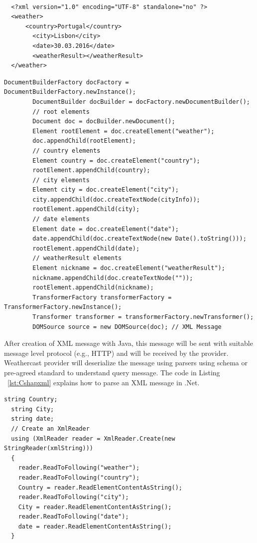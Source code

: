 \begin{lstlisting}[caption=Example XML message to send weathercast provider, label=lst:xml]

  <?xml version="1.0" encoding="UTF-8" standalone="no" ?>
  <weather>
      <country>Portugal</country>
  		<city>Lisbon</city>
  		<date>30.03.2016</date>
  		<weatherResult></weatherResult>
  </weather>

\end{lstlisting}

\begin{lstlisting}[caption=XML message creation with Java Code, label=lst:javaxml]
  		DocumentBuilderFactory docFactory = DocumentBuilderFactory.newInstance();
  		DocumentBuilder docBuilder = docFactory.newDocumentBuilder();
  		// root elements
  		Document doc = docBuilder.newDocument();
  		Element rootElement = doc.createElement("weather");
  		doc.appendChild(rootElement);
  		// country elements
  		Element country = doc.createElement("country");
  		rootElement.appendChild(country);
  		// city elements
  		Element city = doc.createElement("city");
  		city.appendChild(doc.createTextNode(cityInfo));
  		rootElement.appendChild(city);
  		// date elements
  		Element date = doc.createElement("date");
  		date.appendChild(doc.createTextNode(new Date().toString()));
  		rootElement.appendChild(date);
  		// weatherResult elements
  		Element nickname = doc.createElement("weatherResult");
  		nickname.appendChild(doc.createTextNode(""));
  		rootElement.appendChild(nickname);
  		TransformerFactory transformerFactory = TransformerFactory.newInstance();
  		Transformer transformer = transformerFactory.newTransformer();
  		DOMSource source = new DOMSource(doc); // XML Message
\end{lstlisting}

After creation of XML message with Java, this message will be sent with suitable message level protocol (e.g., HTTP) and will be received by the provider. Weathercast provider will deserialize the message using parsers using schema or pre-agreed standard to understand query message. The code in Listing ~\ref{lst:Cshapxml} explains how to parse an XML message in .Net.

\begin{lstlisting}[caption=XML message parsing with .Net Code, label=lst:Cshapxml]
  string Country;
  string City;
  string date;
  // Create an XmlReader
  using (XmlReader reader = XmlReader.Create(new StringReader(xmlString)))
  {
    reader.ReadToFollowing("weather");
    reader.ReadToFollowing("country");
    Country = reader.ReadElementContentAsString();
    reader.ReadToFollowing("city");
    City = reader.ReadElementContentAsString();
    reader.ReadToFollowing("date");
    date = reader.ReadElementContentAsString();
  }

\end{lstlisting}

